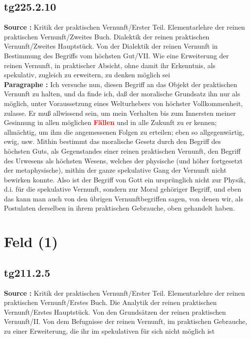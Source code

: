 \documentclass[a4paper,12pt,twoside]{book}
\newcommand{\match}[1]{\textcolor{red}{\textbf{#1}}}
\newcommand{\unnumberedsection}[1]{
	\section*{#1}
	\addcontentsline{toc}{section}{#1}
	\markright{#1}
}
\begin{document}
	\subsection*{tg225.2.10} 
	\textbf{Source : }Kritik der praktischen Vernunft/Erster Teil. Elementarlehre der reinen praktischen Vernunft/Zweites Buch. Dialektik der reinen praktischen Vernunft/Zweites Hauptstück. Von der Dialektik der reinen Vernunft in Bestimmung des Begriffs vom höchsten Gut/VII. Wie eine Erweiterung der reinen Vernunft, in praktischer Absicht, ohne damit ihr Erkenntnis, als spekulativ, zugleich zu erweitern, zu denken möglich sei\\  
	
	\noindent\textbf{Paragraphe : }Ich versuche nun, diesen Begriff an das Objekt der praktischen Vernunft zu halten, und da finde ich, daß der moralische Grundsatz ihn nur als möglich, unter Voraussetzung eines Welturhebers von höchster Vollkommenheit, zulasse. Er muß allwissend sein, um mein Verhalten bis zum Innersten meiner Gesinnung in allen möglichen \match{Fällen} und in alle Zukunft zu er kennen; allmächtig, um ihm die angemessenen Folgen zu erteilen; eben so allgegenwärtig, ewig, usw. Mithin bestimmt das moralische Gesetz durch den Begriff des höchsten Guts, als Gegenstandes einer reinen praktischen Vernunft, den Begriff des Urwesens als höchsten Wesens, welches der physische (und höher fortgesetzt der metaphysische), mithin der ganze spekulative  Gang der Vernunft nicht bewirken konnte. Also ist der Begriff von Gott ein ursprünglich nicht zur Physik, d.i. für die spekulative Vernunft, sondern zur Moral gehöriger Begriff, und eben das kann man auch von den übrigen Vernunftbegriffen sagen, von denen wir, als Postulaten derselben in ihrem praktischen Gebrauche, oben gehandelt haben. 
	
	\unnumberedsection{Feld (1)} 
	\subsection*{tg211.2.5} 
	\textbf{Source : }Kritik der praktischen Vernunft/Erster Teil. Elementarlehre der reinen praktischen Vernunft/Erstes Buch. Die Analytik der reinen praktischen Vernunft/Erstes Hauptstück. Von den Grundsätzen der reinen praktischen Vernunft/II. Von dem Befugnisse der reinen Vernunft, im praktischen Gebrauche, zu einer Erweiterung, die ihr im spekulativen für sich nicht möglich ist\\  
	
\end{document}
